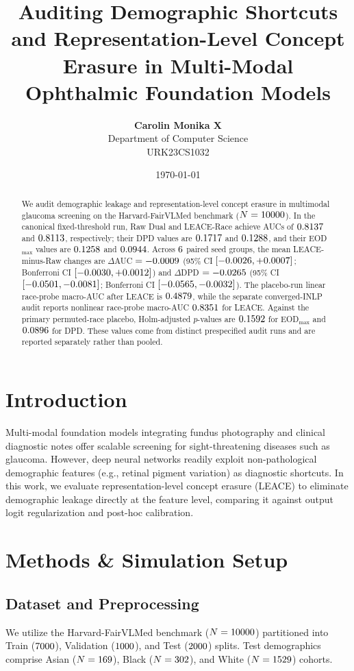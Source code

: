 \documentclass[11pt,a4paper]{article}
\title{\textbf{Auditing Demographic Shortcuts and Representation-Level Concept Erasure in Multi-Modal Ophthalmic Foundation Models}}
\author{\textbf{Carolin Monika X} \\ Department of Computer Science \\ URK23CS1032}
\date{\today}
\begin{document}
\maketitle



\begin{abstract}
We audit demographic leakage and representation-level concept erasure in multimodal glaucoma screening on the Harvard-FairVLMed benchmark ($N=10000$). In the canonical fixed-threshold run, Raw Dual and LEACE-Race achieve AUCs of $0.8137$ and $0.8113$, respectively; their DPD values are $0.1717$ and $0.1288$, and their EOD$_{\max}$ values are $0.1258$ and $0.0944$. Across $6$ paired seed groups, the mean LEACE-minus-Raw changes are $\Delta$AUC $=-0.0009$ (95\% CI $[-0.0026, +0.0007]$; Bonferroni CI $[-0.0030, +0.0012]$) and $\Delta$DPD $=-0.0265$ (95\% CI $[-0.0501, -0.0081]$; Bonferroni CI $[-0.0565, -0.0032]$). The placebo-run linear race-probe macro-AUC after LEACE is $0.4879$, while the separate converged-INLP audit reports nonlinear race-probe macro-AUC $0.8351$ for LEACE. Against the primary permuted-race placebo, Holm-adjusted $p$-values are $0.1592$ for EOD$_{\max}$ and $0.0896$ for DPD. These values come from distinct prespecified audit runs and are reported separately rather than pooled.
\end{abstract}

\section{Introduction}
Multi-modal foundation models integrating fundus photography and clinical diagnostic notes offer scalable screening for sight-threatening diseases such as glaucoma. However, deep neural networks readily exploit non-pathological demographic features (e.g., retinal pigment variation) as diagnostic shortcuts. In this work, we evaluate representation-level concept erasure (LEACE) to eliminate demographic leakage directly at the feature level, comparing it against output logit regularization and post-hoc calibration.

\section{Methods \& Simulation Setup}
\subsection{Dataset and Preprocessing}
We utilize the Harvard-FairVLMed benchmark ($N=10000$) partitioned into Train ($7000$), Validation ($1000$), and Test ($2000$) splits. Test demographics comprise Asian ($N=169$), Black ($N=302$), and White ($N=1529$) cohorts.
\end{document}

